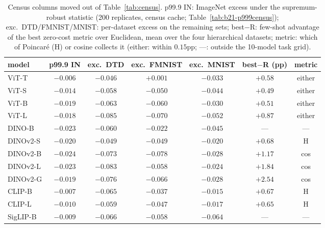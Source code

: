 \begin{table}[H]
\centering
\small
\setlength{\tabcolsep}{4.5pt}
\begin{tabular}{l c c c c c c}
\toprule
model & p99.9 IN & exc.\ DTD & exc.\ FMNIST & exc.\ MNIST & best$-$R (pp) & metric \\
\midrule
ViT-T & $-0.006$ & $-0.046$ & $+0.001$ & $-0.033$ & $+0.58$ & either \\
ViT-S & $-0.014$ & $-0.058$ & $-0.050$ & $-0.044$ & $+0.49$ & either \\
ViT-B & $-0.019$ & $-0.063$ & $-0.060$ & $-0.030$ & $+0.51$ & either \\
ViT-L & $-0.018$ & $-0.085$ & $-0.070$ & $-0.052$ & $+0.87$ & either \\
\midrule
DINO-B & $-0.023$ & $-0.060$ & $-0.022$ & $-0.045$ & --- & --- \\
DINOv2-S & $-0.020$ & $-0.049$ & $-0.049$ & $-0.020$ & $+0.68$ & H \\
DINOv2-B & $-0.024$ & $-0.073$ & $-0.078$ & $-0.028$ & $+1.17$ & cos \\
DINOv2-L & $-0.023$ & $-0.083$ & $-0.058$ & $-0.024$ & $+1.84$ & cos \\
DINOv2-G & $-0.019$ & $-0.076$ & $-0.066$ & $-0.028$ & $+2.54$ & cos \\
\midrule
CLIP-B & $-0.007$ & $-0.065$ & $-0.037$ & $-0.015$ & $+0.67$ & H \\
CLIP-L & $-0.010$ & $-0.059$ & $-0.047$ & $-0.017$ & $+0.65$ & H \\
SigLIP-B & $-0.009$ & $-0.066$ & $-0.058$ & $-0.064$ & --- & --- \\
\bottomrule
\end{tabular}
\caption{Census columns moved out of Table~\ref{tab:census}. p99.9 IN: ImageNet excess under the supremum-robust statistic (200 replicates, census cache; Table~\ref{tab:b21-p999census}); exc.\ DTD/FMNIST/MNIST: per-dataset excess on the remaining sets; best$-$R: few-shot advantage of the best zero-cost metric over Euclidean, mean over the four hierarchical datasets; metric: which of Poincar\'e (H) or cosine collects it (either: within $0.15$pp; ---: outside the 10-model task grid). %
}
\label{tab:census-extra}
\end{table}
